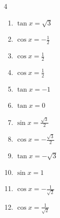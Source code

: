 \begin{multicols}{4}
\begin{enumerate}
  \item $\displaystyle \tan{x}  = \sqrt{3}$


  \item $\displaystyle \cos{x}  = -\frac{1}{2}$


  \item $\displaystyle \cos{x}  = \frac{1}{2}$


  \item $\displaystyle \cos{x}  = \frac{1}{2}$


  \item $\displaystyle \tan{x}  = -1$


  \item $\displaystyle \tan{x}  = 0$

        \phantom{$\displaystyle x = 0 , \pi$}

  \item $\displaystyle \sin{x}  = \frac{\sqrt{3}}{2}$


  \item $\displaystyle \cos{x}  = -\frac{\sqrt{3}}{2}$


  \item $\displaystyle \tan{x}  = -\sqrt{3}$


  \item $\displaystyle \sin{x}  = 1$


  \item $\displaystyle \cos{x}  = -\frac{1}{\sqrt{2}}$


  \item $\displaystyle \cos{x}  = \frac{1}{\sqrt{2}}$


\end{enumerate}
\end{multicols}

